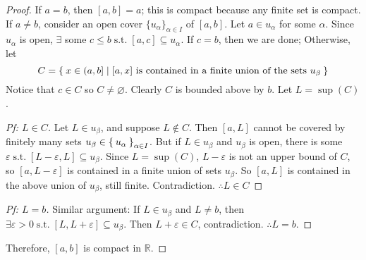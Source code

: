 \documentclass[12pt]{amsart}
\newcommand{\bbR}{\mathbb{R}}
\newcommand{\suchthat}{\operatorname{s.t.}}
\theoremstyle{plain}
\theoremstyle{remark}
\theoremstyle{definition}
\begin{document}
\begin{proof}
If $a = b$, then $[a, b] = {a}$; this is compact because any finite set is compact.
\newline
If $a \neq b$, consider an open cover $\{u_{\alpha}\}_{\alpha \in I}$ of $[a, b]$.
\newline
Let $a \in u_{\alpha}$ for some $\alpha$. Since $u_{\alpha}$ is open, $\exists$ some $c \leqslant b \suchthat [a, c] \subseteq u_{\alpha}$. If $c = b$, then we are done; Otherwise, let 
\begin{equation*}
C = \Set{x \in (a, b] | [a, x] \text{ is contained in a finite union of the sets } u_{\beta}}
\end{equation*}
Notice that $c \in C$ so $C \neq \varnothing$. Clearly $C$ is bounded above by $b$. Let $L = \sup(C)$.

\begin{proof}[Pf: $L \in C$]
\hfill
\newline
Let $L \in u_{\beta}$, and suppose $L\notin C$. Then $[a, L]$ cannot be covered by finitely many sets $u_{\beta} \in \Set{u_{\alpha}}_{\alpha \in I}$. But if $L \in u_{\beta}$ and $u_{\beta}$ is open, there is some $\varepsilon \suchthat [L - \varepsilon, L] \subseteq u_{\beta}$.
\newline
Since $L = \sup(C)$, $L-\varepsilon$ is not an upper bound of $C$, so $[a, L-\varepsilon]$ is contained in a finite union of sets $u_{\beta}$. So $[a, L]$ is contained in the above union of $u_{\beta}$, still finite. Contradiction.
\newline
$\therefore L \in C$
\end{proof}

\begin{proof}[Pf: $L=b$]
\hfill
\newline
Similar argument: If $L \in u_{\beta}$ and $L \neq b$, then $\exists \varepsilon > 0 \suchthat [L, L+\varepsilon] \subseteq u_{\beta}$.
\newline
Then $L + \varepsilon \in C$, contradiction.
\newline
$\therefore L = b$.
\end{proof}
Therefore, $[a, b]$ is compact in $\bbR$.
\end{proof}
\end{document}
